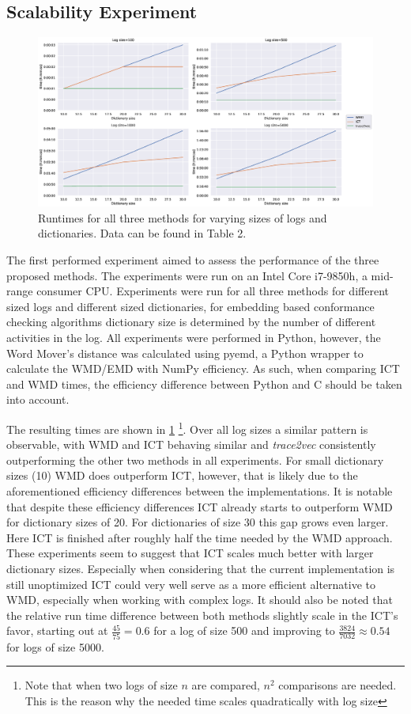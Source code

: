\documentclass[runningheads]{template/llncs}
\begin{document}
\subsection{Scalability Experiment}
\begin{figure}
	\includegraphics[width=1\textwidth]{figures/scaling}
	\caption{Runtimes for all three methods for varying sizes of logs and dictionaries. Data can be found in \cite{MuCa10} Table 2.}
	\label{fig:scalability}
\end{figure}
The first performed experiment aimed to assess the performance  of the three proposed methods.
The experiments were run on an Intel Core i7-9850h, a mid-range consumer CPU.
Experiments were run for all three methods for different sized logs and different sized dictionaries, for embedding based conformance checking algorithms dictionary size is determined by the number of different activities in the log.
All experiments were performed in Python, however, the Word Mover's distance was calculated using pyemd, a Python wrapper to calculate the WMD/EMD with NumPy efficiency.
As such, when comparing ICT and WMD times, the efficiency difference between Python and C should be taken into account.

The resulting times are shown in \cref{fig:scalability}
\footnote{Note that when two logs of size $n$ are compared, $n^2$ comparisons are needed. This is the reason why the needed time scales quadratically with log size}.
Over all log sizes a similar pattern is observable, with WMD and ICT behaving similar and \emph{trace2vec} consistently outperforming the other two methods in all experiments.
For small dictionary sizes  (10) WMD does outperform ICT, however, that is likely due to the aforementioned efficiency differences between the implementations.
It is notable that despite these efficiency differences ICT already starts to outperform WMD for dictionary sizes of 20.
For dictionaries of size 30 this gap grows even larger.
Here ICT is finished after roughly half the time needed by the WMD approach.
These experiments seem to suggest that ICT scales much better with larger dictionary sizes.
Especially when considering that the current implementation is still unoptimized ICT could very well serve as a more efficient alternative to WMD, especially when working with complex logs.
It should also be noted that the relative run time difference between both methods slightly scale in the ICT's favor, starting out at $\frac{45}{75}=0.6$ for a log of size 500 and improving to $\frac{3824}{7032}\approx 0.54$ for logs of size 5000.
\end{document}
